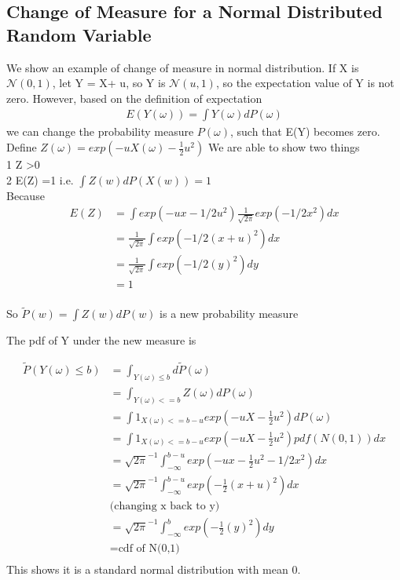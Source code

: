 \documentclass[a4paper]{article}
\begin{document}
\subsection{Change of Measure for a Normal Distributed Random Variable}
We show an example of change of measure in normal distribution. If X is $\mathcal N(0,1)$, let Y = X+ u, so Y is $\mathcal N(u,1)$, so the expectation value of Y is not zero. However, based
on the definition of expectation\\
\begin{align*}
	E(Y(\omega)) = \int Y(\omega) dP(\omega)
\end{align*}
we can change the probability measure $P(\omega)$, such that E(Y) becomes zero.
Define $Z(\omega) = exp(-uX(\omega) - \frac{1}{2}u^2)$
We are able to show two things\\ 
1 Z \textgreater 0 \\
2 E(Z) =1 i.e. $\int Z(w)dP(X(w)) = 1$ \\
Because 
\begin{align*}
E(Z)  & = \int exp(-ux-1/2u^2) \frac{1}{\sqrt{2\pi}} exp(-1/2x^2) dx\\
& = \frac{1}{\sqrt{2\pi}}  \int exp(-1/2(x+u)^2) dx \\
& = \frac{1}{\sqrt{2\pi}}  \int exp(-1/2(y)^2) dy \\
& = 1 \\
\end{align*}

So $\tilde P(w) = \int Z(w) dP(w)$ is a new probability measure

The pdf of Y under the new measure is

\begin{align*}
	\tilde P(Y(\omega) \leq b) & = \int_{Y(\omega) \leq b} d \tilde P(\omega) \\
&= \int_{Y(\omega)<=b} Z(\omega) dP(\omega) \\
&= \int 1_{X(\omega)<=b-u} exp(-uX- \frac{1}{2} u^2 )dP(\omega) \\
&=\int 1_{X(\omega)<=b-u} exp(-uX- \frac{1}{2} u^2 ) pdf(N(0,1)) dx \\
&=  {\sqrt{2\pi}}^{-1} \int_{-\infty}^{b-u} exp(-ux -\frac{1}{2}u^2 -1/2x^2) dx \\
&=  {\sqrt{2\pi}}^{-1}\int_{-\infty}^{b-u} exp(-\frac{1}{2} (x+u)^2) dx \\
&\textrm{(changing x back to y)}\\
&=  {\sqrt{2\pi}}^{-1}\int _{-\infty}^{b} exp(-\frac{1}{2} (y)^2) dy \\
&= \textrm{cdf of N(0,1)} \\
\end{align*}
This shows it is a standard normal distribution with mean 0.\\
\end{document}
